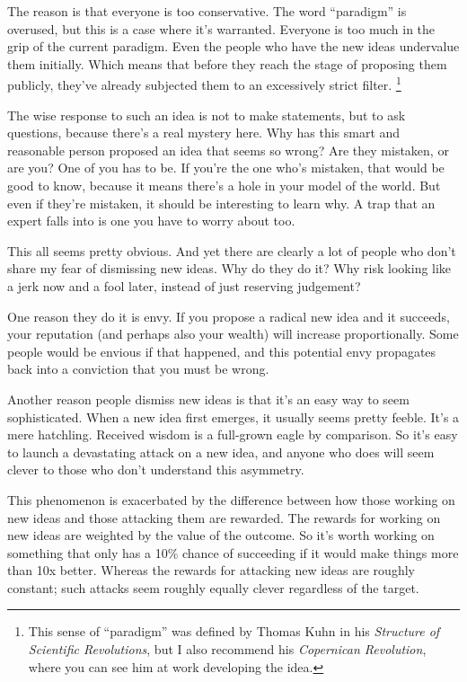 The reason is that everyone is too conservative. The word ``paradigm''
is overused, but this is a case where it's warranted. Everyone is too
much in the grip of the current paradigm. Even the people who have the
new ideas undervalue them initially. Which means that before they reach
the stage of proposing them publicly, they've already subjected them to
an excessively strict filter. \footnote{This sense of ``paradigm'' was defined by Thomas Kuhn in his
\emph{Structure of Scientific Revolutions}, but I also recommend his
\emph{Copernican Revolution}, where you can see him at work developing
the idea.}

The wise response to such an idea is not to make statements, but to ask
questions, because there's a real mystery here. Why has this smart and
reasonable person proposed an idea that seems so wrong? Are they
mistaken, or are you? One of you has to be. If you're the one who's
mistaken, that would be good to know, because it means there's a hole in
your model of the world. But even if they're mistaken, it should be
interesting to learn why. A trap that an expert falls into is one you
have to worry about too.

This all seems pretty obvious. And yet there are clearly a lot of people
who don't share my fear of dismissing new ideas. Why do they do it? Why
risk looking like a jerk now and a fool later, instead of just reserving
judgement?

One reason they do it is envy. If you propose a radical new idea and it
succeeds, your reputation (and perhaps also your wealth) will increase
proportionally. Some people would be envious if that happened, and this
potential envy propagates back into a conviction that you must be wrong.

Another reason people dismiss new ideas is that it's an easy way to seem
sophisticated. When a new idea first emerges, it usually seems pretty
feeble. It's a mere hatchling. Received wisdom is a full-grown eagle by
comparison. So it's easy to launch a devastating attack on a new idea,
and anyone who does will seem clever to those who don't understand this
asymmetry.

This phenomenon is exacerbated by the difference between how those
working on new ideas and those attacking them are rewarded. The rewards
for working on new ideas are weighted by the value of the outcome. So
it's worth working on something that only has a 10\% chance of
succeeding if it would make things more than 10x better. Whereas the
rewards for attacking new ideas are roughly constant; such attacks seem
roughly equally clever regardless of the target.

